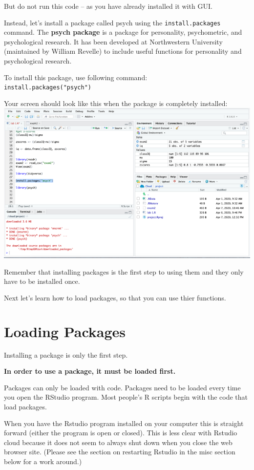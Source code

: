 \documentclass[
]{book}
\begin{document}
But do not run this code -- as you have already installed it with GUI.

Instead, let's install a package called psych using the \texttt{install.packages} command. The \textbf{psych package} is a package for personality, psychometric, and psychological research. It has been developed at Northwestern University (maintained by William Revelle) to include useful functions for personality and psychological research.

To install this package, use following command:\\
\texttt{install.packages("psych")}

Your screen should look like this when the package is completely installed:\\
\includegraphics{img/instpsyc.png}

Remember that installing packages is the first step to using them and they only have to be installed once.

Next let's learn how to load packages, so that you can use thier functions.

\hypertarget{loading-packages}{%
\section{Loading Packages}\label{loading-packages}}

Installing a package is only the first step.

\textbf{In order to use a package, it must be loaded first.}

Packages can only be loaded with code. Packages need to be loaded every time you open the RStudio program. Most people's R scripts begin with the code that load packages.

When you have the Rstudio program installed on your computer this is straight forward (either the program is open or closed). This is less clear with Rstudio cloud because it does not seem to always shut down when you close the web browser site. (Please see the section on restarting Rstudio in the misc section below for a work around.)
\end{document}

